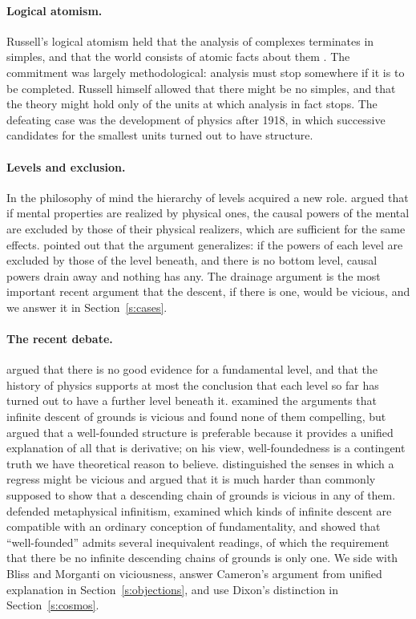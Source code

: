 \documentclass{situationist-preprint}
\begin{document}
\paragraph{Logical atomism.} Russell's logical atomism held that the analysis of complexes terminates in simples, and that the world consists of atomic facts about them \citep{Russell1918}. The commitment was largely methodological: analysis must stop somewhere if it is to be completed. Russell himself allowed that there might be no simples, and that the theory might hold only of the units at which analysis in fact stops. The defeating case was the development of physics after 1918, in which successive candidates for the smallest units turned out to have structure.

\paragraph{Levels and exclusion.} In the philosophy of mind the hierarchy of levels acquired a new role. \citet{Kim1998} argued that if mental properties are realized by physical ones, the causal powers of the mental are excluded by those of their physical realizers, which are sufficient for the same effects. \citet{Block2003} pointed out that the argument generalizes: if the powers of each level are excluded by those of the level beneath, and there is no bottom level, causal powers drain away and nothing has any. The drainage argument is the most important recent argument that the descent, if there is one, would be vicious, and we answer it in Section~\ref{s:cases}.

\paragraph{The recent debate.} \citet{Schaffer2003} argued that there is no good evidence for a fundamental level, and that the history of physics supports at most the conclusion that each level so far has turned out to have a further level beneath it. \citet{Cameron2008} examined the arguments that infinite descent of grounds is vicious and found none of them compelling, but argued that a well-founded structure is preferable because it provides a unified explanation of all that is derivative; on his view, well-foundedness is a contingent truth we have theoretical reason to believe. \citet{Bliss2013} distinguished the senses in which a regress might be vicious and argued that it is much harder than commonly supposed to show that a descending chain of grounds is vicious in any of them. \citet{Morganti2014} defended metaphysical infinitism, \citet{Tahko2014} examined which kinds of infinite descent are compatible with an ordinary conception of fundamentality, and \citet{Dixon2016} showed that \enquote{well-founded} admits several inequivalent readings, of which the requirement that there be no infinite descending chains of grounds is only one. We side with Bliss and Morganti on viciousness, answer Cameron's argument from unified explanation in Section~\ref{s:objections}, and use Dixon's distinction in Section~\ref{s:cosmos}.
\end{document}
